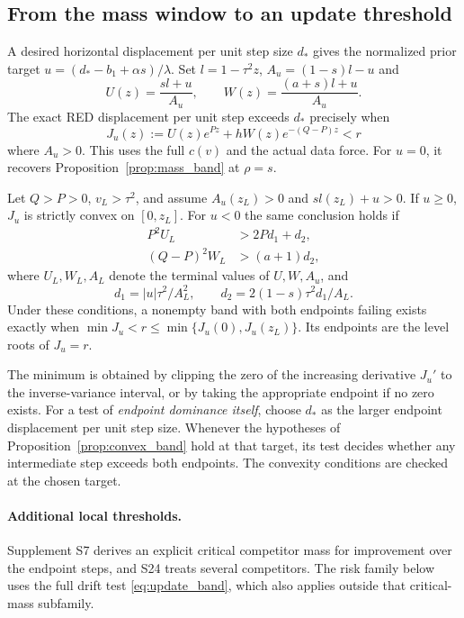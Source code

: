 \subsection{From the mass window to an update threshold}
A desired horizontal displacement per unit step size $d_*$ gives
the normalized prior target $u=(d_*-b_1+\alpha s)/\lambda$.
Set $l=1-\tau^2 z$, $A_u=(1-s)l-u$ and
\begin{equation}\label{eq:update_ratios}
 U(z)=\frac{s l+u}{A_u},\qquad
 W(z)=\frac{(a+s)l+u}{A_u}.
\end{equation}
The exact RED displacement per unit step exceeds $d_*$ precisely when
\begin{equation}\label{eq:update_band}
 J_u(z):=U(z)e^{Pz}+hW(z)e^{-(Q-P)z}<r
\end{equation}
where $A_u>0$. This uses the full $c(v)$ and the actual data force.
For $u=0$, it recovers Proposition~\ref{prop:mass_band} at $\rho=s$.

\begin{proposition}\label{prop:convex_band}
Let $Q>P>0$, $v_L>\tau^2$, and assume $A_u(z_L)>0$ and
$s l(z_L)+u>0$. If $u\ge0$, $J_u$ is strictly convex on $[0,z_L]$.
For $u<0$ the same conclusion holds if
\begin{align}
 P^2U_L&>2P d_1+d_2,\nonumber\\
 (Q-P)^2 W_L&>(a+1)d_2,\label{eq:band_convexity}
\end{align}
where $U_L,W_L,A_L$ denote the terminal values of $U,W,A_u$, and
\[
 d_1=|u|\tau^2/A_L^2,\qquad
 d_2=2(1-s)\tau^2 d_1/A_L.
\]
Under these conditions, a nonempty band with both endpoints failing
exists exactly when $\min J_u<r\le\min\{J_u(0),J_u(z_L)\}$.
Its endpoints are the level roots of $J_u=r$.
\end{proposition}

The minimum is obtained by clipping the zero of the increasing
derivative $J_u'$ to the inverse-variance interval, or by taking the
appropriate endpoint if no zero exists. For a test of \emph{endpoint
dominance itself}, choose $d_*$ as the larger endpoint displacement
per unit step size. Whenever the hypotheses of
Proposition~\ref{prop:convex_band} hold at that target, its test
decides whether any intermediate step exceeds both endpoints.
The convexity conditions are checked at the chosen target.

\paragraph{Additional local thresholds.}
Supplement S7 derives an explicit critical competitor mass for
improvement over the endpoint steps, and S24 treats several
competitors. The risk family below uses the full drift test
\eqref{eq:update_band}, which also applies outside that critical-mass
subfamily.

